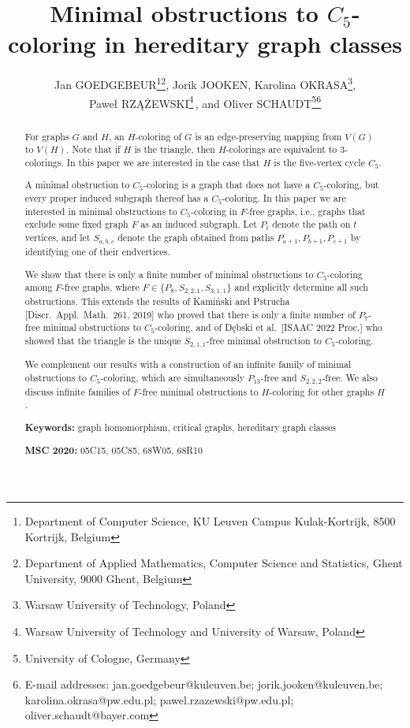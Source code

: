 \documentclass[11pt,a4paper]{article}
\theoremstyle{mystyle}
\begin{document}
\title{Minimal obstructions to $C_5$-coloring in hereditary graph classes}
\author{{\sc Jan GOEDGEBEUR\footnote{Department of Computer Science, KU Leuven Campus Kulak-Kortrijk, 8500 Kortrijk, Belgium}\;\footnote{Department of Applied Mathematics, Computer Science and Statistics, Ghent University, 9000 Ghent, Belgium}\;,
Jorik JOOKEN\footnotemark[1]\;,
Karolina OKRASA\footnote{Warsaw University of Technology, Poland}\;, }\\[1mm]
Paweł \MakeUppercase{Rzążewski}\footnote{Warsaw University of Technology and University of Warsaw, Poland}\;\,,
and {Oliver SCHAUDT\footnote{University of Cologne, Germany}}\;\footnote{E-mail addresses: jan.goedgebeur@kuleuven.be; jorik.jooken@kuleuven.be; karolina.okrasa@pw.edu.pl; pawel.rzazewski@pw.edu.pl;
oliver.schaudt@bayer.com}}
\date{}

\maketitle


\begin{abstract}
For graphs $G$ and $H$, an $H$-coloring of $G$ is an edge-preserving mapping from $V(G)$ to $V(H)$.
Note that if $H$ is the triangle, then $H$-colorings are equivalent to $3$-colorings.
In this paper we are interested in the case that $H$ is the five-vertex cycle $C_5$.

A minimal obstruction to $C_5$-coloring is a graph that does not have a $C_5$-coloring, but every proper induced subgraph thereof has a $C_5$-coloring. In this paper we are interested in minimal obstructions to $C_5$-coloring in $F$-free graphs, i.e., graphs that exclude some fixed graph $F$ as an induced subgraph. Let $P_t$ denote the path on $t$ vertices, and let $S_{a,b,c}$ denote the graph obtained from paths $P_{a+1},P_{b+1},P_{c+1}$ by identifying one of their endvertices.

We show that there is only a finite number of minimal obstructions to $C_5$-coloring among $F$-free graphs, where $F \in \{ P_8, S_{2,2,1}, S_{3,1,1}\}$ and explicitly determine all such obstructions. This extends the results of Kamiński and Pstrucha [Discr.\ Appl.\ Math.\ 261, 2019] who proved that there is only a finite number of $P_7$-free minimal obstructions to $C_5$-coloring, and of Dębski et al.\ [ISAAC 2022 Proc.] who showed that the triangle is the unique $S_{2,1,1}$-free minimal obstruction to $C_5$-coloring.

We complement our results with a construction of an infinite family of minimal obstructions to $C_5$-coloring, which are simultaneously $P_{13}$-free and $S_{2,2,2}$-free.
We also discuss infinite families of $F$-free minimal obstructions to $H$-coloring for other graphs $H$.

\bigskip\noindent \textbf{Keywords:} graph homomorphism, critical graphs, hereditary graph classes

\smallskip\noindent \textbf{MSC 2020:} 05C15, 05C85, 68W05, 68R10
\end{abstract}
\end{document}
